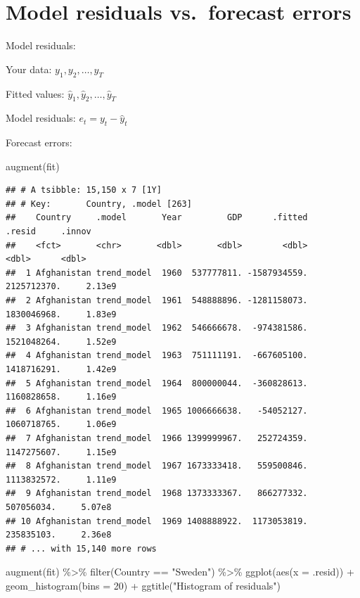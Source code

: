 \documentclass[
]{book}
\newenvironment{Shaded}{\begin{snugshade}}{\end{snugshade}}
\newcommand{\AttributeTok}[1]{\textcolor[rgb]{0.77,0.63,0.00}{#1}}
\newcommand{\DecValTok}[1]{\textcolor[rgb]{0.00,0.00,0.81}{#1}}
\newcommand{\FunctionTok}[1]{\textcolor[rgb]{0.00,0.00,0.00}{#1}}
\newcommand{\NormalTok}[1]{#1}
\newcommand{\SpecialCharTok}[1]{\textcolor[rgb]{0.00,0.00,0.00}{#1}}
\newcommand{\StringTok}[1]{\textcolor[rgb]{0.31,0.60,0.02}{#1}}
\begin{document}
\hypertarget{model-residuals-vs.-forecast-errors-1}{%
\section{Model residuals vs.~forecast errors}\label{model-residuals-vs.-forecast-errors-1}}

Model residuals:

Your data: \(y_1, y_2, \ldots, y_T\)

Fitted values: \(\hat{y}_1, \hat{y}_2, \ldots, \hat{y}_T\)

Model residuals: \(e_t = y_t - \hat{y}_t\)

Forecast errors:

\begin{Shaded}
\begin{Highlighting}[]
\FunctionTok{augment}\NormalTok{(fit)}
\end{Highlighting}
\end{Shaded}

\begin{verbatim}
## # A tsibble: 15,150 x 7 [1Y]
## # Key:       Country, .model [263]
##    Country     .model       Year         GDP      .fitted      .resid     .innov
##    <fct>       <chr>       <dbl>       <dbl>        <dbl>       <dbl>      <dbl>
##  1 Afghanistan trend_model  1960  537777811. -1587934559. 2125712370.     2.13e9
##  2 Afghanistan trend_model  1961  548888896. -1281158073. 1830046968.     1.83e9
##  3 Afghanistan trend_model  1962  546666678.  -974381586. 1521048264.     1.52e9
##  4 Afghanistan trend_model  1963  751111191.  -667605100. 1418716291.     1.42e9
##  5 Afghanistan trend_model  1964  800000044.  -360828613. 1160828658.     1.16e9
##  6 Afghanistan trend_model  1965 1006666638.   -54052127. 1060718765.     1.06e9
##  7 Afghanistan trend_model  1966 1399999967.   252724359. 1147275607.     1.15e9
##  8 Afghanistan trend_model  1967 1673333418.   559500846. 1113832572.     1.11e9
##  9 Afghanistan trend_model  1968 1373333367.   866277332.  507056034.     5.07e8
## 10 Afghanistan trend_model  1969 1408888922.  1173053819.  235835103.     2.36e8
## # ... with 15,140 more rows
\end{verbatim}

\begin{Shaded}
\begin{Highlighting}[]
\FunctionTok{augment}\NormalTok{(fit) }\SpecialCharTok{\%\textgreater{}\%} \FunctionTok{filter}\NormalTok{(Country }\SpecialCharTok{==} \StringTok{"Sweden"}\NormalTok{) }\SpecialCharTok{\%\textgreater{}\%}
  \FunctionTok{ggplot}\NormalTok{(}\FunctionTok{aes}\NormalTok{(}\AttributeTok{x =}\NormalTok{ .resid)) }\SpecialCharTok{+}
  \FunctionTok{geom\_histogram}\NormalTok{(}\AttributeTok{bins =} \DecValTok{20}\NormalTok{) }\SpecialCharTok{+}
  \FunctionTok{ggtitle}\NormalTok{(}\StringTok{"Histogram of residuals"}\NormalTok{)}
\end{Highlighting}
\end{Shaded}
\end{document}
